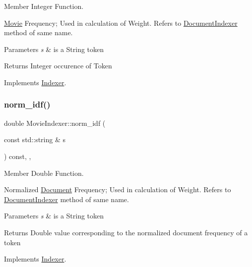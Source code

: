 Member Integer Function. 

\hyperlink{class_movie}{Movie} Frequency; Used in calculation of Weight. Refers to \hyperlink{class_document_indexer}{Document\+Indexer} method of same name.


\begin{DoxyParams}{Parameters}
{\em s} & is a String token \\
\hline
\end{DoxyParams}
\begin{DoxyReturn}{Returns}
Integer occurence of Token 
\end{DoxyReturn}


Implements \hyperlink{class_indexer_a9f9ea4d9946c531f257720cc9e9391eb}{Indexer}.

\mbox{\label{class_movie_indexer_a488c038d7aa0b60d5e8192c12f19c33e}} 
\subsubsection{\texorpdfstring{norm\+\_\+idf()}{norm\_idf()}}
{\footnotesize\ttfamily double Movie\+Indexer\+::norm\+\_\+idf (\begin{DoxyParamCaption}\item[{const std\+::string \&}]{s }\end{DoxyParamCaption}) const\hspace{0.3cm}{\ttfamily [override]}, {\ttfamily [private]}, {\ttfamily [virtual]}}



Member Double Function. 

Normalized \hyperlink{class_document}{Document} Frequency; Used in calculation of Weight. Refers to \hyperlink{class_document_indexer}{Document\+Indexer} method of same name.


\begin{DoxyParams}{Parameters}
{\em s} & is a String token \\
\hline
\end{DoxyParams}
\begin{DoxyReturn}{Returns}
Double value corresponding to the normalized document frequency of a token 
\end{DoxyReturn}


Implements \hyperlink{class_indexer_af71c69a4267217969f21cba44822f263}{Indexer}.

